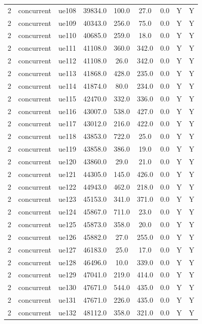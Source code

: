 \begin{table}[ht]
\begin{tabular}{|c|c|c|c|c|c|c|c|c|}
2 & concurrent & ue108 & 39834.0 & 100.0 & 27.0 & 0.0 & Y & Y \\
2 & concurrent & ue109 & 40343.0 & 256.0 & 75.0 & 0.0 & Y & Y \\
2 & concurrent & ue110 & 40685.0 & 259.0 & 18.0 & 0.0 & Y & Y \\
2 & concurrent & ue111 & 41108.0 & 360.0 & 342.0 & 0.0 & Y & Y \\
2 & concurrent & ue112 & 41108.0 & 26.0 & 342.0 & 0.0 & Y & Y \\
2 & concurrent & ue113 & 41868.0 & 428.0 & 235.0 & 0.0 & Y & Y \\
2 & concurrent & ue114 & 41874.0 & 80.0 & 234.0 & 0.0 & Y & Y \\
2 & concurrent & ue115 & 42470.0 & 332.0 & 336.0 & 0.0 & Y & Y \\
2 & concurrent & ue116 & 43007.0 & 538.0 & 427.0 & 0.0 & Y & Y \\
2 & concurrent & ue117 & 43012.0 & 216.0 & 422.0 & 0.0 & Y & Y \\
2 & concurrent & ue118 & 43853.0 & 722.0 & 25.0 & 0.0 & Y & Y \\
2 & concurrent & ue119 & 43858.0 & 386.0 & 19.0 & 0.0 & Y & Y \\
2 & concurrent & ue120 & 43860.0 & 29.0 & 21.0 & 0.0 & Y & Y \\
2 & concurrent & ue121 & 44305.0 & 145.0 & 426.0 & 0.0 & Y & Y \\
2 & concurrent & ue122 & 44943.0 & 462.0 & 218.0 & 0.0 & Y & Y \\
2 & concurrent & ue123 & 45153.0 & 341.0 & 371.0 & 0.0 & Y & Y \\
2 & concurrent & ue124 & 45867.0 & 711.0 & 23.0 & 0.0 & Y & Y \\
2 & concurrent & ue125 & 45873.0 & 358.0 & 20.0 & 0.0 & Y & Y \\
2 & concurrent & ue126 & 45882.0 & 27.0 & 255.0 & 0.0 & Y & Y \\
2 & concurrent & ue127 & 46183.0 & 25.0 & 17.0 & 0.0 & Y & Y \\
2 & concurrent & ue128 & 46496.0 & 10.0 & 339.0 & 0.0 & Y & Y \\
2 & concurrent & ue129 & 47041.0 & 219.0 & 414.0 & 0.0 & Y & Y \\
2 & concurrent & ue130 & 47671.0 & 544.0 & 435.0 & 0.0 & Y & Y \\
2 & concurrent & ue131 & 47671.0 & 226.0 & 435.0 & 0.0 & Y & Y \\
2 & concurrent & ue132 & 48112.0 & 358.0 & 321.0 & 0.0 & Y & Y \\

\end{tabular}
\end{table}
